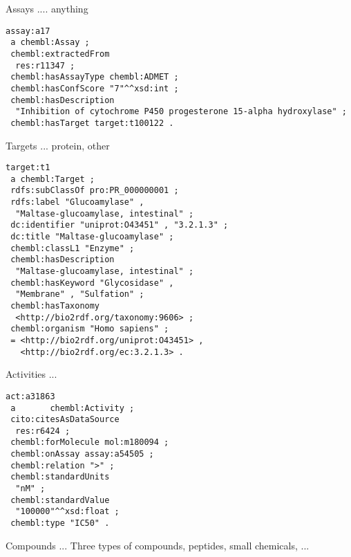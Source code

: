 \documentclass[sw]{iosart2c}
\begin{document}
Assays .... anything

\begin{small}
\begin{verbatim}
assay:a17
 a chembl:Assay ;
 chembl:extractedFrom
  res:r11347 ;
 chembl:hasAssayType chembl:ADMET ;
 chembl:hasConfScore "7"^^xsd:int ;
 chembl:hasDescription
  "Inhibition of cytochrome P450 progesterone 15-alpha hydroxylase" ;
 chembl:hasTarget target:t100122 .
\end{verbatim}
\end{small}

Targets ... protein, other

\begin{small}
\begin{verbatim}
target:t1
 a chembl:Target ;
 rdfs:subClassOf pro:PR_000000001 ;
 rdfs:label "Glucoamylase" , 
  "Maltase-glucoamylase, intestinal" ;
 dc:identifier "uniprot:O43451" , "3.2.1.3" ;
 dc:title "Maltase-glucoamylase" ;
 chembl:classL1 "Enzyme" ;
 chembl:hasDescription
  "Maltase-glucoamylase, intestinal" ;
 chembl:hasKeyword "Glycosidase" , 
  "Membrane" , "Sulfation" ;
 chembl:hasTaxonomy
  <http://bio2rdf.org/taxonomy:9606> ;
 chembl:organism "Homo sapiens" ;
 = <http://bio2rdf.org/uniprot:O43451> , 
   <http://bio2rdf.org/ec:3.2.1.3> .
\end{verbatim}
\end{small}

Activities ...

\begin{small}
\begin{verbatim}
act:a31863
 a       chembl:Activity ;
 cito:citesAsDataSource
  res:r6424 ;
 chembl:forMolecule mol:m180094 ;
 chembl:onAssay assay:a54505 ;
 chembl:relation ">" ;
 chembl:standardUnits
  "nM" ;
 chembl:standardValue
  "100000"^^xsd:float ;
 chembl:type "IC50" .
\end{verbatim}
\end{small}

Compounds ... Three types of compounds, peptides, small chemicals, ...
\end{document}
